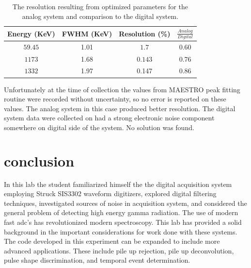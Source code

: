 \documentclass[twocolumn,preprintnumbers,superscriptaddress,amsmath,amssymb,floatfix]{revtex4-1}
\begin{document}
\begin{table}[h]
\caption{The resolution resulting from optimized parameters for the analog system and comparison to the digital system. 
\label{analog}}
\centering
\begin{tabular}{cccc}
\hline
Energy (KeV) & FWHM (KeV) & Resolution (\%)&$\frac{Analog}{Digital}$   \\
 \hline
$59.45$ & 1.01& $1.7$ & 0.60\\
$1173$ & 1.68 &$ 0.143 $ & 0.76\\
$1332 $& 1.97 & 0.147 & 0.86\\
\hline
\end{tabular}
\end{table}

Unfortunately at the time of collection the values from MAESTRO peak fitting routine were recorded without uncertainty, so no error is reported on these values. The analog system in this case produced better resolution. The digital system data were collected on had a strong electronic noise component somewhere on digital side of the system. No solution was found. 
\section{conclusion}
\label{conc}
In this lab the student familiarized himself the the digital acquisition system employing Struck SIS3302 waveform digitizers, explored digital filtering techniques, investigated sources of noise in acquisition system, and considered the general problem of detecting high energy gamma radiation. The use of modern fast adc's has revolutionized modern spectroscopy. This lab has provided a solid background in the important considerations for work done with these systems. The code developed in this experiment can be expanded to include more advanced applications. These include pile up rejection, pile up deconvolution, pulse shape discrimination, and temporal event determination.  
\end{document}
